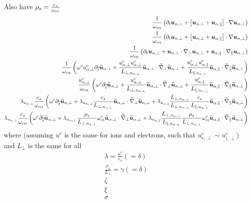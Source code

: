 Also have
$\rho_s=\frac{c_s}{\omega_{ci}}$
%
\begin{align*}
 \frac{1}{\omega_{c\alpha}}
 \left(
 \partial_t \boldsymbol{u}_{\alpha,\perp}
 + \left[\boldsymbol{u}_{\alpha,\perp}
 + \boldsymbol{u}_{\alpha,\|}\right]\cdot\nabla\boldsymbol{u}_{\alpha,\perp}
 \right)
 \\
 \frac{1}{\omega_{c\alpha}}
 \left(
 \partial_t \boldsymbol{u}_{\alpha,\perp}
 + \left[\boldsymbol{u}_{\alpha,\perp}
 + \boldsymbol{u}_{\alpha,\|}\right]\cdot\nabla\boldsymbol{u}_{\alpha,\perp}
 \right)
 \\
 \frac{1}{\omega_{c\alpha}}
 \left(
 \partial_t \boldsymbol{u}_{\alpha,\perp}
 + \boldsymbol{u}_{\alpha,\perp}\cdot\nabla_\perp\boldsymbol{u}_{\alpha,\perp}
 + \boldsymbol{u}_{\alpha,\|}\cdot\nabla_\|\boldsymbol{u}_{\alpha,\perp}
 \right)
 \\
 \frac{1}{\omega_{c\alpha}}
 \left(
 \omega^cu^c_{\alpha,\perp}
 \partial_{\widetilde{ t}} \widetilde{ \boldsymbol{u}}_{\alpha,\perp}
 + \frac{u_{\alpha,\perp}^{c}u_{\alpha,\perp}^{c}}{L_{\perp, u_{\alpha,\perp}}}
 \widetilde{ \boldsymbol{u}}_{\alpha,\perp}\cdot\widetilde{ \nabla}_\perp\widetilde{ \boldsymbol{u}}_{\alpha,\perp}
 + \frac{u^c_{\alpha,\perp}u^c_{\alpha,\|}}{L_{\|, u_{\alpha,\perp}}}
 \widetilde{ \boldsymbol{u}}_{\alpha,\|}\cdot\widetilde{ \nabla}_\|\widetilde{ \boldsymbol{u}}_{\alpha,\perp}
 \right)
 \\
 \frac{u^c_{\alpha,\perp}}{\omega_{c\alpha}}
 \left(
 \omega^c
 \partial_{\widetilde{ t}} \widetilde{ \boldsymbol{u}}_{\alpha,\perp}
 + \frac{u^c_{\alpha,\perp}}{L_{\perp, u_{\alpha,\perp}}}
 \widetilde{ \boldsymbol{u}}_{\alpha,\perp}\cdot\widetilde{ \nabla}_\perp\widetilde{ \boldsymbol{u}}_{\alpha,\perp}
 + \frac{u^c_{\alpha,\|}}{L_{\|, u_{\alpha,\perp}}}
 \widetilde{ \boldsymbol{u}}_{\alpha,\|}\cdot\widetilde{ \nabla}_\|\widetilde{ \boldsymbol{u}}_{\alpha,\perp}
 \right)
 \\
 \lambda_{u_{\alpha,\perp}}
 \frac{c_s}{\omega_{c\alpha}}
 \left(
 \omega^c
 \partial_{\widetilde{ t}} \widetilde{ \boldsymbol{u}}_{\alpha,\perp}
 +
 \lambda_{u_{\alpha,\perp}}
 \frac{ c_s }{L_{\perp, u_{\alpha,\perp}}}
 \widetilde{ \boldsymbol{u}}_{\alpha,\perp}\cdot\widetilde{ \nabla}_\perp\widetilde{ \boldsymbol{u}}_{\alpha,\perp}
 +
 \lambda_{u_{\alpha,\|}}
 \frac{L_{\perp, u_{\alpha,\perp}}}{L_{\perp, u_{\alpha,\perp}}}
 \frac{c_s}{L_{\|, u_{\alpha,\perp}}}
 \widetilde{ \boldsymbol{u}}_{\alpha,\|}\cdot\widetilde{ \nabla}_\|\widetilde{ \boldsymbol{u}}_{\alpha,\perp}
 \right)
 \\
 \lambda_{u_{\alpha,\perp}}
 \frac{c_s}{\omega_{c\alpha}}
 \left(
 \omega^c
 \partial_{\widetilde{ t}} \widetilde{ \boldsymbol{u}}_{\alpha,\perp}
 +
 \lambda_{u_{\alpha,\perp}}
 \frac{ \rho_s }{L_{\perp, u_{\alpha,\perp}}}
 \omega^c_{ci}
 \widetilde{ \boldsymbol{u}}_{\alpha,\perp}\cdot\widetilde{ \nabla}_\perp\widetilde{ \boldsymbol{u}}_{\alpha,\perp}
 +
 \lambda_{u_{\alpha,\|}}
 \frac{L_{\perp, u_{\alpha,\perp}}}{L_{\|, u_{\alpha,\perp}}}
 \frac{\rho_s}{L_{\perp, u_{\alpha,\perp}}}
 \omega^c_{ci}
 \widetilde{ \boldsymbol{u}}_{\alpha,\|}\cdot\widetilde{ \nabla}_\|\widetilde{ \boldsymbol{u}}_{\alpha,\perp}
 \right)
\end{align*}
%
where (assuming $u^c$ is the same for ions and electrons, such that $u^c_{e,\perp}\sim u^c_{i,\perp}$) and $L_\perp$ is the same for all
\begin{align*}
    \lambda = \frac{u^c}{c_s} (= \delta)\\
    \frac{ \rho_s }{L_{\perp}} = \gamma(= \delta)\\
    \zeta\\
    \xi\\
    \sigma\\
\end{align*}
